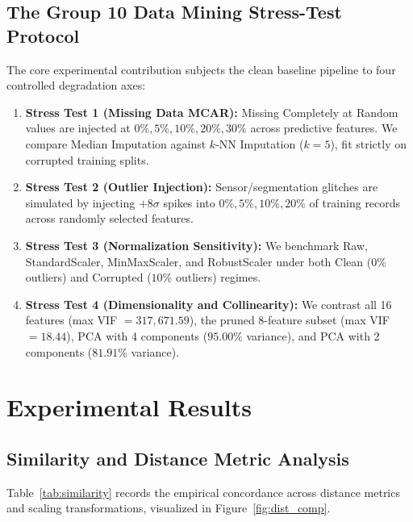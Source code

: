 \documentclass[11pt,a4paper]{article}
\begin{document}
\subsection{The Group 10 Data Mining Stress-Test Protocol}
\label{subsec:meth_stress_protocol}

The core experimental contribution subjects the clean baseline pipeline to four controlled degradation axes:
\begin{enumerate}[leftmargin=1.5em]
    \item \textbf{Stress Test 1 (Missing Data MCAR):} Missing Completely at Random values are injected at $0\%, 5\%, 10\%, 20\%, 30\%$ across predictive features. We compare Median Imputation against $k$-NN Imputation ($k = 5$), fit strictly on corrupted training splits.
    \item \textbf{Stress Test 2 (Outlier Injection):} Sensor/segmentation glitches are simulated by injecting $+8\sigma$ spikes into $0\%, 5\%, 10\%, 20\%$ of training records across randomly selected features.
    \item \textbf{Stress Test 3 (Normalization Sensitivity):} We benchmark Raw, StandardScaler, MinMaxScaler, and RobustScaler under both Clean ($0\%$ outliers) and Corrupted ($10\%$ outliers) regimes.
    \item \textbf{Stress Test 4 (Dimensionality and Collinearity):} We contrast all 16 features (max VIF $= 317{,}671.59$), the pruned 8-feature subset (max VIF $= 18.44$), PCA with 4 components ($95.00\%$ variance), and PCA with 2 components ($81.91\%$ variance).
\end{enumerate}

\section{Experimental Results}
\label{sec:results}

\subsection{Similarity and Distance Metric Analysis}
\label{subsec:res_similarity}

Table~\ref{tab:similarity} records the empirical concordance across distance metrics and scaling transformations, visualized in Figure~\ref{fig:dist_comp}.
\end{document}
